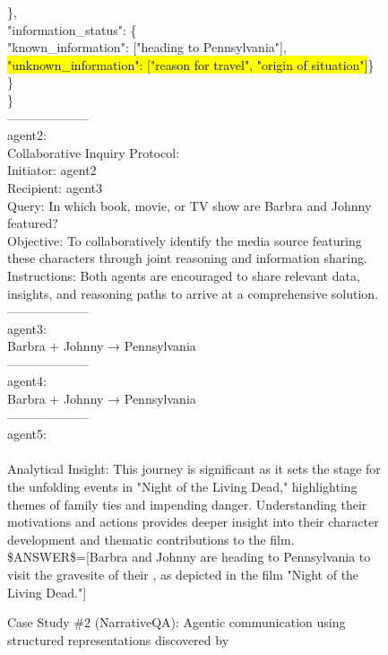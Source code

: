 \begin{figure}[h!]
{\begin{minipage}{0.98\columnwidth}
{\hspace{1em}\},\\
\hspace{1em}"information\_status": \{\\
\hspace{2em}"known\_information": ["heading to Pennsylvania"],\\
\hspace{2em}\hl{"unknown\_information": ["reason for travel", "origin of situation"]}\}\\
\hspace{1em}\}\\
\}}\\
--------------------\\
agent2:\\
Collaborative Inquiry Protocol:\\
Initiator: agent2\\
Recipient: agent3\\
Query: In which book, movie, or TV show are Barbra and Johnny featured?\\
Objective: To collaboratively identify the media source featuring these characters through joint reasoning and information sharing.\\
Instructions: Both agents are encouraged to share relevant data, insights, and reasoning paths to arrive at a comprehensive solution.\\
--------------------\\
agent3:\\
Barbra + Johnny → Pennsylvania\\
--------------------\\
agent4:\\
Barbra + Johnny → Pennsylvania\\
--------------------\\
agent5:\\
\\
Analytical Insight: This journey is significant as it sets the stage for the unfolding events in "Night of the Living Dead," highlighting themes of family ties and impending danger. Understanding their motivations and actions provides deeper insight into their character development and thematic contributions to the film.\\
\$ANSWER\$=[Barbra and Johnny are heading to Pennsylvania to visit the gravesite of their , as depicted in the film "Night of the Living Dead."]
\end{minipage}}
\centering
\caption{Case Study \#2 (NarrativeQA): Agentic communication using structured representations discovered by \method}
\label{fig:llm_prompt_case2_sc}
\vspace{-0.15in}
\end{figure}
